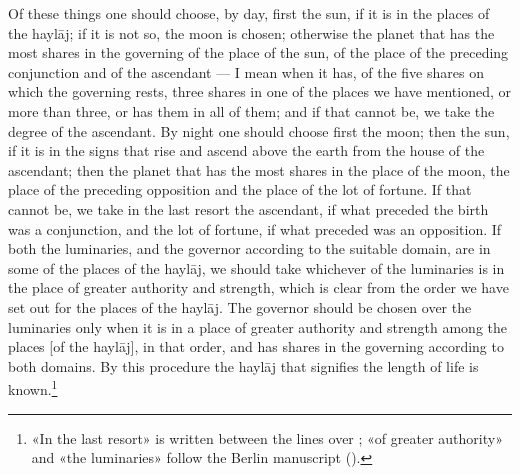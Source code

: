 \documentclass[11pt]{article}
\newcommand{\Fol}[1]{\marginpar{\footnotesize\color{gray}f.\,#1}}
\begin{document}
\par \Fol{46v}Of these things one should choose, by day, first the sun, if it is in the places of the haylāj; if it is not so, the moon is chosen; otherwise the planet that has the most shares in the governing of the place of the sun, of the place of the preceding conjunction and of the ascendant — I mean when it has, of the five shares on which the governing rests, three shares in one of the places we have mentioned, or more than three, or has them in all of them; and if that cannot be, we take the degree of the ascendant. By night one should choose first the moon; then the sun, if it is in the signs that rise and ascend above the earth from the house of the ascendant; then the planet that has the most shares in the place of the moon, the place of the preceding opposition and the place of the lot of fortune. If that cannot be, we take in the last resort the ascendant, if what preceded the birth was a conjunction, and the lot of fortune, if what preceded was an opposition. If both the luminaries, and the governor according to the suitable domain, are in some of the places of the haylāj, we should take whichever of the luminaries is in the place of greater authority and strength, which is clear from the order we have set out for the places of the haylāj. The governor should be chosen over the luminaries only when it is in a place of greater authority and strength among the places [of the haylāj], in that order, and has shares in the governing according to both domains. By this procedure the haylāj that signifies the length of life is known.\footnote{«In the last resort» is written between the lines over ; «of greater authority» and «the luminaries» follow the Berlin manuscript ().}\par
\end{document}
